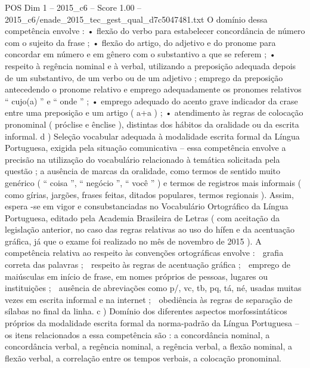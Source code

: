 \begin{textsample}{POS Dim 1 – 2015\_c6 – Score 1.00 – 2015\_c6/enade\_2015\_tec\_gest\_qual\_d7c5047481.txt}
O domínio dessa competência envolve : • flexão do verbo para estabelecer concordância de número com o sujeito da frase ; • flexão do artigo, do adjetivo e do pronome para concordar em número e em gênero com o substantivo a que se referem ; • respeito à regência nominal e à verbal, utilizando a preposição adequada depois de um substantivo, de um verbo ou de um adjetivo ; emprego da preposição antecedendo o pronome relativo e emprego adequadamente os pronomes relativos “ cujo(a) ” e “ onde ” ; • emprego adequado do acento grave indicador da crase entre uma preposição e um artigo ( a+a ) ; • atendimento às regras de colocação pronominal ( próclise e ênclise ), distintas dos hábitos da oralidade ou da escrita informal. d ) Seleção vocabular adequada à modalidade escrita formal da Língua Portuguesa, exigida pela situação comunicativa – essa competência envolve a precisão na utilização do vocabulário relacionado à temática solicitada pela questão ; a ausência de marcas da oralidade, como termos de sentido muito genérico ( “ coisa ”, “ negócio ”, “ você ” ) e termos de registros mais informais ( como gírias, jargões, frases feitas, ditados populares, termos regionais ).
Assim, espera -se em vigor e consubstanciadas no Vocabulário Ortográfico da Língua Portuguesa, editado pela Academia Brasileira de Letras ( com aceitação da legislação anterior, no caso das regras relativas ao uso do hífen e da acentuação gráfica, já que o exame foi realizado no mês de novembro de 2015 ).
A competência relativa ao respeito às convenções ortográficas envolve :  grafia correta das palavras ;  respeito às regras de acentuação gráfica ;  emprego de maiúsculas em início de frase, em nomes próprios de pessoas, lugares ou instituições ;  ausência de abreviações como p/, vc, tb, pq, tá, né, usadas muitas vezes em escrita informal e na internet ;  obediência às regras de separação de sílabas no final da linha. c ) Domínio dos diferentes aspectos morfossintáticos próprios da modalidade escrita formal da norma-padrão da Língua Portuguesa – os itens relacionados a essa competência são : a concordância nominal, a concordância verbal, a regência nominal, a regência verbal, a flexão nominal, a flexão verbal, a correlação entre os tempos verbais, a colocação pronominal.

\end{textsample}
